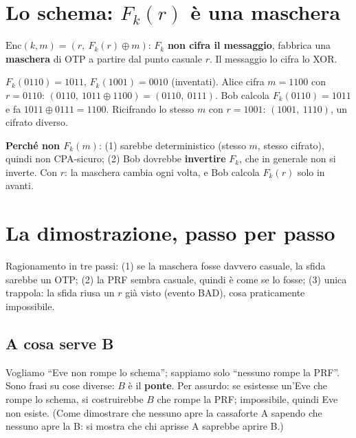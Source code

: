 \section{Lo schema: \texorpdfstring{\(F_k(r)\)}{F\_k(r)} è una maschera}

\begin{inbreve}
\(\text{Enc}(k, m) = (r,\ F_k(r) \oplus m)\): \(F_k\) \textbf{non cifra il messaggio}, fabbrica una \textbf{maschera} di OTP a partire dal punto casuale \(r\). Il messaggio lo cifra lo XOR.
\end{inbreve}

\begin{esempio}
\(F_k(0110) = 1011\), \(F_k(1001) = 0010\) (inventati). Alice cifra \(m = 1100\) con \(r = 0110\): \((0110,\ 1011 \oplus 1100) = (0110,\ 0111)\). Bob calcola \(F_k(0110) = 1011\) e fa \(1011 \oplus 0111 = 1100\). Ricifrando lo stesso \(m\) con \(r = 1001\): \((1001,\ 1110)\), un cifrato diverso.
\end{esempio}

\textbf{Perché non \(F_k(m)\)}: (1) sarebbe deterministico (stesso \(m\), stesso cifrato), quindi non CPA-sicuro; (2) Bob dovrebbe \textbf{invertire} \(F_k\), che in generale non si inverte. Con \(r\): la maschera cambia ogni volta, e Bob calcola \(F_k(r)\) solo in avanti.

\section{La dimostrazione, passo per passo}

\begin{inbreve}
Ragionamento in tre passi: (1) se la maschera fosse davvero casuale, la sfida sarebbe un OTP; (2) la PRF sembra casuale, quindi è come se lo fosse; (3) unica trappola: la sfida riusa un \(r\) già visto (evento BAD), cosa praticamente impossibile.
\end{inbreve}

\subsection{A cosa serve B}

Vogliamo ``Eve non rompe lo schema''; sappiamo solo ``nessuno rompe la PRF''. Sono frasi su cose diverse: \(B\) è il \textbf{ponte}. Per assurdo: se esistesse un'Eve che rompe lo schema, si costruirebbe \(B\) che rompe la PRF; impossibile, quindi Eve non esiste. (Come dimostrare che nessuno apre la cassaforte A sapendo che nessuno apre la B: si mostra che chi aprisse A saprebbe aprire B.)

